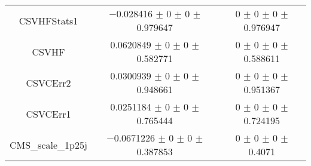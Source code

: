 \begin{table}
\begin{tabular}{ccc}
CSVHFStats1 & \num{-0.028416} $\pm$ \num{0} $\pm$ \num{0} $\pm$ \num{0.979647} & \num{0} $\pm$ \num{0} $\pm$ \num{0} $\pm$ \num{0.976947}\\
CSVHF & \num{0.0620849} $\pm$ \num{0} $\pm$ \num{0} $\pm$ \num{0.582771} & \num{0} $\pm$ \num{0} $\pm$ \num{0} $\pm$ \num{0.588611}\\
CSVCErr2 & \num{0.0300939} $\pm$ \num{0} $\pm$ \num{0} $\pm$ \num{0.948661} & \num{0} $\pm$ \num{0} $\pm$ \num{0} $\pm$ \num{0.951367}\\
CSVCErr1 & \num{0.0251184} $\pm$ \num{0} $\pm$ \num{0} $\pm$ \num{0.765444} & \num{0} $\pm$ \num{0} $\pm$ \num{0} $\pm$ \num{0.724195}\\
CMS\_scale\_1p25j & \num{-0.0671226} $\pm$ \num{0} $\pm$ \num{0} $\pm$ \num{0.387853} & \num{0} $\pm$ \num{0} $\pm$ \num{0} $\pm$ \num{0.4071}\\
\bottomrule
\end{tabular}
\end{table}